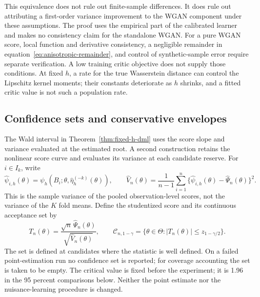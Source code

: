 This equivalence does not rule out finite-sample differences. It does rule out
attributing a first-order variance improvement to the WGAN component under
these assumptions. The proof uses the empirical part of the calibrated
learner and makes no consistency claim for the standalone WGAN. For a pure
WGAN score, local function and derivative consistency, a negligible remainder
in equation~\eqref{eq:anisotropic-remainder}, and control of synthetic-sample
error require separate verification. A low training critic objective does not
supply those conditions. At fixed $h$, a rate for the true Wasserstein distance
can control the Lipschitz kernel moments; their constants deteriorate as $h$
shrinks, and a fitted critic value is not such a population rate.

\subsection{Confidence sets and conservative envelopes}
\label{sec:score-confidence-sets}

The Wald interval in Theorem~\ref{thm:fixed-h-dml} uses the score slope and
variance evaluated at the estimated root. A second construction retains the
nonlinear score curve and evaluates its variance at each candidate reserve.
For $i\in I_k$, write
\[
\widehat\psi_{i,h}(\theta)
=\psi_h\!\left(B_i;\theta,\widehat\eta_h^{(-k)}(\theta)\right),
\qquad
\widehat V_n(\theta)
=\frac{1}{n-1}\sum_{i=1}^n
\{\widehat\psi_{i,h}(\theta)-\widehat\Psi_n(\theta)\}^2.
\]
This is the sample variance of the pooled observation-level scores, not the
variance of the $K$ fold means. Define the studentized score and its continuous
acceptance set by
\begin{equation}
T_n(\theta)=\frac{\sqrt n\,\widehat\Psi_n(\theta)}
{\sqrt{\widehat V_n(\theta)}},
\qquad
\mathcal C_{n,1-\gamma}
=\{\theta\in\Theta: |T_n(\theta)|\leq z_{1-\gamma/2}\}.
\label{eq:score-confidence-set}
\end{equation}
The set is defined at candidates where the statistic is well defined. On a
failed point-estimation run no confidence set is reported; for coverage
accounting the set is taken to be empty. The critical value
is fixed before the experiment; it is 1.96 in the 95 percent comparisons below.
Neither the point estimate nor the nuisance-learning procedure is changed.

